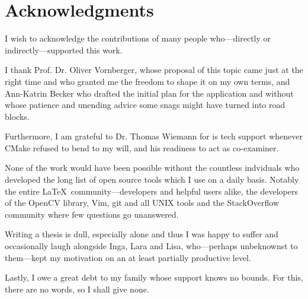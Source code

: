 \chapter*{Acknowledgments}

I wish to acknowledge the contributions of many people who---directly or
indirectly---supported this work. 

I thank Prof. Dr. Oliver Vornberger, whose proposal of this topic came just at
the right time and who granted me the freedom to shape it on my own terms, and
Ann-Katrin Becker who drafted the initial plan for the application and without
whose patience and unending advice some snags might have turned into road
blocks. 

Furthermore, I am grateful to Dr. Thomas Wiemann for is tech support
whenever CMake refused to bend to my will, and his readiness to act as
co-examiner.

None of the work would have been possible without the countless indviduals who
developed the long list of open source tools which I use on a daily basis.
Notably the entire \LaTeX\ community---developers and helpful users alike, the
developers of the OpenCV library, Vim, git and all UNIX tools and the
StackOverflow community where few questions go unanswered.

Writing a thesis is dull, especially alone and thus I was happy to suffer and
occasionally laugh alongside Inga, Lara and Lisa, who---perhaps unbeknownst to
them---kept my motivation on an at least partially productive level.

Lastly, I owe a great debt to my family whose support knows no bounds. For this,
there are no words, so I shall give none.
